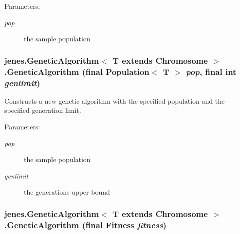 \begin{Desc}
\item[Parameters:]
\begin{description}
\item[{\em pop}]the sample population \end{description}
\end{Desc}
\hypertarget{classjenes_1_1_genetic_algorithm_3_01_t_01extends_01_chromosome_01_4_fe0501230c1645d2a6cdf54af2672639}{
\subsubsection[GeneticAlgorithm]{\setlength{\rightskip}{0pt plus 5cm}jenes.GeneticAlgorithm$<$ T extends Chromosome $>$.GeneticAlgorithm (final Population$<$ T $>$ {\em pop}, \/  final int {\em genlimit})}}
\label{classjenes_1_1_genetic_algorithm_3_01_t_01extends_01_chromosome_01_4_fe0501230c1645d2a6cdf54af2672639}


Constructs a new genetic algorithm with the specified population and the specified generation limit. 

\begin{Desc}
\item[Parameters:]
\begin{description}
\item[{\em pop}]the sample population \item[{\em genlimit}]the generations upper bound \end{description}
\end{Desc}
\hypertarget{classjenes_1_1_genetic_algorithm_3_01_t_01extends_01_chromosome_01_4_efcf45276a730906c98ff8de90b6c48e}{
\subsubsection[GeneticAlgorithm]{\setlength{\rightskip}{0pt plus 5cm}jenes.GeneticAlgorithm$<$ T extends Chromosome $>$.GeneticAlgorithm (final Fitness {\em fitness})}}
\label{classjenes_1_1_genetic_algorithm_3_01_t_01extends_01_chromosome_01_4_efcf45276a730906c98ff8de90b6c48e}


